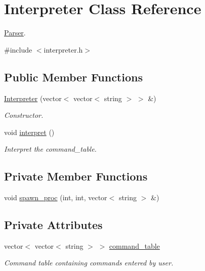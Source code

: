 \hypertarget{classInterpreter}{}\section{Interpreter Class Reference}
\label{classInterpreter}


\hyperlink{classParser}{Parser}.  




{\ttfamily \#include $<$interpreter.\+h$>$}

\subsection*{Public Member Functions}
\begin{DoxyCompactItemize}
\item 
\hyperlink{classInterpreter_ac3c23e0850edbfb1511dad83f954f311}{Interpreter} (vector$<$ vector$<$ string $>$ $>$ \&)
\begin{DoxyCompactList}\small\item\em Constructor. \end{DoxyCompactList}\item 
void \hyperlink{classInterpreter_ad94c189af098f0c93e16d7b88cc56e5e}{interpret} ()
\begin{DoxyCompactList}\small\item\em Interpret the command\+\_\+table. \end{DoxyCompactList}\end{DoxyCompactItemize}
\subsection*{Private Member Functions}
\begin{DoxyCompactItemize}
\item 
void \hyperlink{classInterpreter_a09554dcc38764a8d179a9b1257c071fd}{spawn\+\_\+proc} (int, int, vector$<$ string $>$ \&)
\end{DoxyCompactItemize}
\subsection*{Private Attributes}
\begin{DoxyCompactItemize}
\item 
vector$<$ vector$<$ string $>$ $>$ \hyperlink{classInterpreter_aa63ca505e3d12d7b52651f3cd0845871}{command\+\_\+table}\hypertarget{classInterpreter_aa63ca505e3d12d7b52651f3cd0845871}{}\label{classInterpreter_aa63ca505e3d12d7b52651f3cd0845871}

\begin{DoxyCompactList}\small\item\em Command table containing commands entered by user. \end{DoxyCompactList}\end{DoxyCompactItemize}


